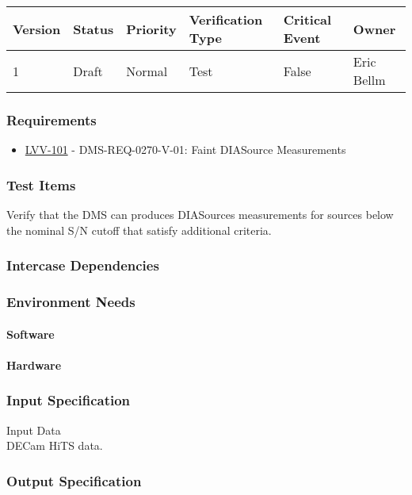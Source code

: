 \begin{longtable}[]{llllll}
\toprule
Version & Status & Priority & Verification Type & Critical Event & Owner
\\\midrule
1 & Draft & Normal &
Test & False & Eric Bellm
\\\bottomrule
\end{longtable}

\subsubsection{Requirements}
\begin{itemize}
\item \href{https://jira.lsstcorp.org/browse/LVV-101}{LVV-101} - DMS-REQ-0270-V-01: Faint DIASource Measurements
\end{itemize}

\subsubsection{Test Items}
Verify that the DMS can produces DIASources measurements for sources
below the nominal S/N cutoff that satisfy additional criteria.



\subsubsection{Intercase Dependencies}

\subsubsection{Environment Needs}

\paragraph{Software}

\paragraph{Hardware}

\subsubsection{Input Specification}
Input Data\\
\hspace*{0.333em}DECam HiTS data.


\subsubsection{Output Specification}

